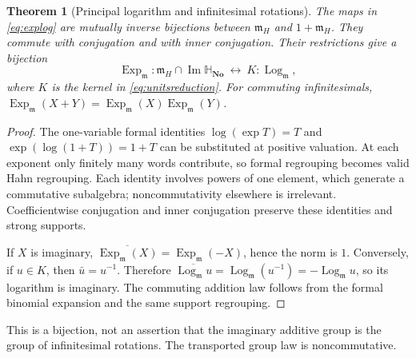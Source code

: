 \documentclass[11pt,letterpaper]{article}
\numberwithin{equation}{section}
\newtheorem{theorem}{Theorem}[section]
\theoremstyle{definition}
\theoremstyle{remark}
\newcommand{\No}{\mathbf{No}}
\newcommand{\SQ}{\mathbb H_{\No}}
\newcommand{\mm}{\mathfrak m}
\newcommand{\Ima}{\operatorname{Im}}
\newcommand{\Exp}{\operatorname{Exp}}
\newcommand{\Log}{\operatorname{Log}}
\begin{document}
\begin{theorem}[Principal logarithm and infinitesimal rotations]\label{thm:principal-log}
The maps in \eqref{eq:explog} are mutually inverse bijections between $\mm_H$ and
$1+\mm_H$. They commute with conjugation and with inner conjugation. Their restrictions give
a bijection
\begin{equation}\label{eq:logunits}
 \Exp_{\mm}:\mm_H\cap\Ima\SQ\ \longleftrightarrow\ K:
 \Log_{\mm},
\end{equation}
where $K$ is the kernel in \eqref{eq:unitsreduction}. For commuting infinitesimals,
$\Exp_{\mm}(X+Y)=\Exp_{\mm}(X)\Exp_{\mm}(Y)$.
\end{theorem}
\begin{proof}
The one-variable formal identities $\log(\exp T)=T$ and
$\exp(\log(1+T))=1+T$ can be substituted at positive valuation. At each exponent only
finitely many words contribute, so formal regrouping becomes valid Hahn regrouping.
Each identity involves powers of one element, which generate a commutative subalgebra;
noncommutativity elsewhere is irrelevant. Coefficientwise conjugation and inner conjugation
preserve these identities and strong supports.

If $X$ is imaginary, $\overline{\Exp_{\mm}(X)}=\Exp_{\mm}(-X)$, hence the norm is $1$.
Conversely, if $u\in K$, then $\bar u=u^{-1}$. Therefore
$\overline{\Log_{\mm}u}=\Log_{\mm}(u^{-1})=-\Log_{\mm}u$, so its logarithm is imaginary.
The commuting addition law follows from the formal binomial expansion and the same support
regrouping.
\end{proof}

This is a bijection, not an assertion that the imaginary additive group is the group of
infinitesimal rotations. The transported group law is noncommutative.
\end{document}
